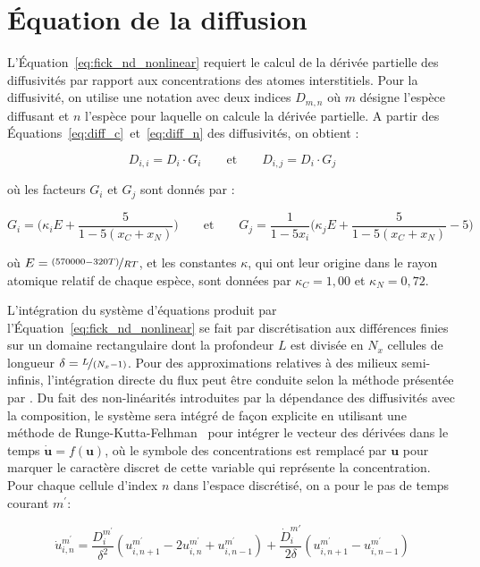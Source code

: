 \chapter{Équation de la diffusion}
\label{an:integration_diffusion}

L'Équation~\ref{eq:fick_nd_nonlinear} requiert le calcul de la dérivée partielle des diffusivités par rapport aux concentrations des atomes interstitiels. Pour la diffusivité, on utilise une notation avec deux indices $D_{m,n}$ où $m$ désigne l'espèce diffusant et $n$ l'espèce pour laquelle on calcule la dérivée partielle. A partir des Équations~\ref{eq:diff_c}~et~\ref{eq:diff_n} des diffusivités, on obtient :

\[
D_{i,i}=D_{i}\cdot G_{i}\quad\quad\text{et}\quad\quad D_{i,j}=D_{i}\cdot G_{j}
\]

\noindent où les facteurs $G_{i}$ et $G_{j}$ sont donnés par :

\[
G_{i}=\biggr(\kappa_{i}E+\frac{5}{1-5\left(x_{C}+x_{N}\right)}\biggr)
\quad\quad\text{et}\quad\quad 
G_{j}=\frac{1}{1-5x_{i}}\biggr(\kappa_{j}E+\frac{5}{1-5\left(x_{C}+x_{N}\right)}-5\biggr)
\]

\noindent où $E=\nicefrac{(570000-320T)}{RT}$, et les constantes $\kappa$, qui ont leur origine dans le rayon atomique relatif de chaque espèce, sont données par $\kappa_{C}=1,00$ et $\kappa_{N}=0,72$.

L'intégration du système d'équations produit par l'Équation~\ref{eq:fick_nd_nonlinear} se fait par discrétisation aux différences finies sur un domaine rectangulaire dont la profondeur $L$ est  divisée en $N_{x}$ cellules de longueur $\delta=\nicefrac{L}{(N_{x}-1)}$. Pour des approximations relatives à des milieux semi-infinis, l'intégration directe du flux peut être conduite selon la méthode présentée par \citet{Karabelchtchikova2007}. Du fait des non-linéarités introduites par la dépendance des diffusivités avec la composition, le système sera intégré de façon explicite en utilisant une méthode de Runge-Kutta-Felhman~\cite{Shampine1976} pour intégrer le vecteur des dérivées dans le temps $\mathbf{\dot{u}}=f(\mathbf{u})$, où le symbole des concentrations est remplacé par $\mathbf{u}$ pour marquer le caractère discret de cette variable qui représente la concentration. Pour chaque cellule d'index $n$ dans l'espace discrétisé, on a pour le pas de temps courant $m^{\prime}$:

\[
\dot{u}_{i,n}^{m^{\prime}}=\frac{D_{i}^{m^{\prime}}}{\delta^{2}}(u_{i,n+1}^{m^{\prime}}-2u_{i,n}^{m^{\prime}}+u_{i,n-1}^{m^{\prime}})+\frac{\dot{D}_{i}^{m\prime}}{2\delta}(u_{i,n+1}^{m^{\prime}}-u_{i,n-1}^{m^{\prime}})
\]

